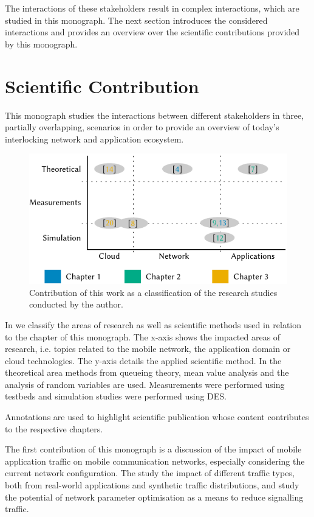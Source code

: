 The interactions of these stakeholders result in complex interactions, which are studied in this monograph.
The next section introduces the considered interactions and provides an overview over the scientific contributions provided by this monograph.

\section{Scientific Contribution}\label{sec:introduction:scientific_contribution}
This monograph studies the interactions between different stakeholders in three, partially overlapping, scenarios in order to provide an overview of today's interlocking network and application ecosystem.

\begin{figure}
\centering
\includegraphics{figures/publications}
\caption{Contribution of this work as a classification of the research studies conducted by the author.}\label{fig:introduction:publications}
\end{figure}

In  we classify the areas of research as well as scientific methods used in relation to the chapter of this monograph.
The x-axis shows the impacted areas of research, i.e. topics related to the mobile network, the application domain or cloud technologies.
The y-axis details the applied scientific method.
In the theoretical area methods from queueing theory, mean value analysis and the analysis of random variables are used.
Measurements were performed using testbeds and simulation studies were performed using \gls{DES}.

Annotations are used to highlight scientific publication whose content contributes to the respective chapters.

The first contribution of this monograph is a discussion of the impact of mobile application traffic on mobile communication networks, especially considering the current network configuration.
The study the impact of different traffic types, both from real-world applications and synthetic traffic distributions, and study the potential of network parameter optimisation as a means to reduce signalling traffic.

